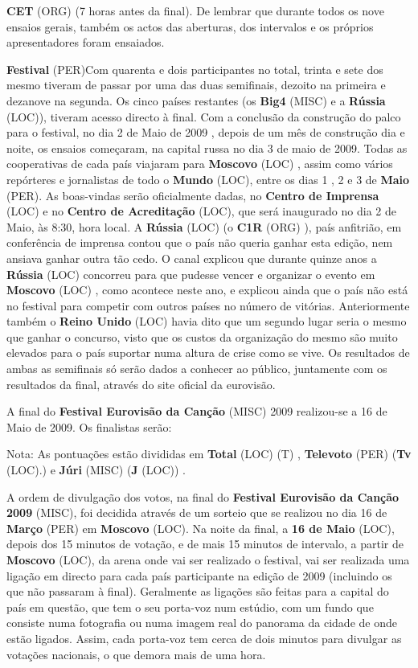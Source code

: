 \documentclass[12pt,a4paper]{article}
\begin{document}
\textbf{CET} (ORG) (7 horas antes da final). De lembrar que durante todos os nove ensaios gerais, também os actos das aberturas, dos intervalos e os próprios apresentadores foram ensaiados.



\textbf{Festival} (PER)Com quarenta e dois participantes no total, trinta e sete dos mesmo tiveram de passar por uma das duas semifinais, dezoito na primeira e dezanove na segunda. Os cinco países restantes (os \textbf{Big4} (MISC) e a \textbf{Rússia} (LOC)), tiveram acesso directo à final. Com a conclusão da construção do palco para o festival, no dia 2 de Maio de 2009 , depois de um mês de construção dia e noite, os ensaios começaram, na capital russa no dia 3 de maio de 2009. Todas as cooperativas de cada país viajaram para \textbf{Moscovo} (LOC) , assim como vários repórteres e jornalistas de todo o \textbf{Mundo} (LOC), entre os dias 1 , 2 e 3 de \textbf{Maio} (PER). As boas-vindas serão oficialmente dadas, no \textbf{Centro de Imprensa} (LOC) e no \textbf{Centro de Acreditação} (LOC), que será inaugurado no dia 2 de Maio, às 8:30, hora local. A \textbf{Rússia} (LOC) (o \textbf{C1R} (ORG) ), país anfitrião, em conferência de imprensa contou que o país não queria ganhar esta edição, nem ansiava ganhar outra tão cedo. O canal explicou que durante quinze anos a \textbf{Rússia} (LOC) concorreu para que pudesse vencer e organizar o evento em \textbf{Moscovo} (LOC) , como acontece neste ano, e explicou ainda que o país não está no festival para competir com outros países no número de vitórias. Anteriormente também o \textbf{Reino Unido} (LOC) havia dito que um segundo lugar seria o mesmo que ganhar o concurso, visto que os custos da organização do mesmo são muito elevados para o país suportar numa altura de crise como se vive. Os resultados de ambas as semifinais só serão dados a conhecer ao público, juntamente com os resultados da final, através do site oficial da eurovisão.

A final do \textbf{Festival Eurovisão da Canção} (MISC) 2009 realizou-se a 16 de Maio de 2009. Os finalistas serão:

Nota: As pontuações estão divididas em \textbf{Total} (LOC) (T) , \textbf{Televoto} (PER) (\textbf{Tv} (LOC).) e \textbf{Júri} (MISC) (\textbf{J} (LOC)) .

A ordem de divulgação dos votos, na final do \textbf{Festival Eurovisão da Canção 2009} (MISC), foi decidida através de um sorteio que se realizou no dia 16 de \textbf{Março} (PER) em \textbf{Moscovo} (LOC). Na noite da final, a \textbf{16 de Maio} (LOC), depois dos 15 minutos de votação, e de mais 15 minutos de intervalo, a partir de \textbf{Moscovo} (LOC), da arena onde vai ser realizado o festival, vai ser realizada uma ligação em directo para cada país participante na edição de 2009 (incluindo os que não passaram à final). Geralmente as ligações são feitas para a capital do país em questão, que tem o seu porta-voz num estúdio, com um fundo que consiste numa fotografia ou numa imagem real do panorama da cidade de onde estão ligados. Assim, cada porta-voz tem cerca de dois minutos para divulgar as votações nacionais, o que demora mais de uma hora.
\end{document}
